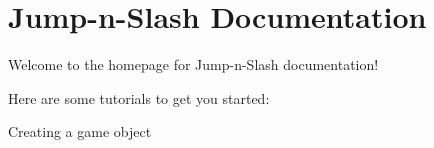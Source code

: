 \chapter{Jump-\/n-\/\+Slash Documentation}
\hypertarget{index}{}\label{index}
Welcome to the homepage for Jump-\/n-\/\+Slash documentation!

Here are some tutorials to get you started\+:
\begin{DoxyEnumerate}
\item {}
\item {}
\item {}
\item Creating a game object 
\end{DoxyEnumerate}